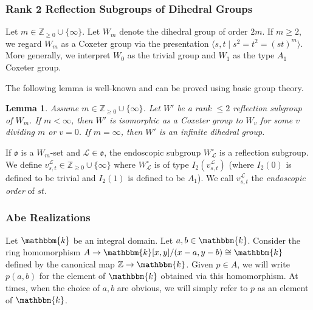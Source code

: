 \documentclass{amsart}
\newcommand{\Z}{\mathbb{Z}}
\renewcommand{\k}{\mathbbm{k}}
\newcommand{\scrL}{\mathcal{L}}
\newcommand{\fr}[1]{\mathfrak{#1}}
\newtheorem{lemma}[subsubsection]{Lemma}
\theoremstyle{definition}
\numberwithin{equation}{subsection}
\begin{document}
\subsubsection{Rank 2 Reflection Subgroups of Dihedral Groups}

Let $m \in \Z_{\geq 0} \cup \{ \infty\}$.
Let $W_m$ denote the dihedral group of order $2m$. If $m \geq 2$, we regard $W_m$ as a Coxeter group via the presentation $\langle s,t \mid s^2 = t^2 = (st)^m \rangle$.
More generally, we interpret $W_0$ as the trivial group and $W_1$ as the type $A_1$ Coxeter group. 

The following lemma is well-known and can be proved using basic group theory.

\begin{lemma}\label{lem:class_of_rk_2_subgroups_of_dihedral_groups}
    Assume $m \in \Z_{\geq 0}  \cup \{ \infty\}$.
    Let $W'$ be a rank $\leq 2$ reflection subgroup of $W_m$. If $m < \infty$, then $W'$ is isomorphic as a Coxeter group to $W_v$ for some $v$ dividing $m$ or $v = 0$.
    If $m = \infty$, then $W'$ is an infinite dihedral group.
\end{lemma}

If $\fr{o}$ is a $W_m$-set and $\scrL \in \fr{o}$, the endoscopic subgroup $W_{\scrL}^{\circ}$ is a reflection subgroup.
We define $v_{s,t}^{\scrL} \in \Z_{\geq 0} \cup \{\infty\}$ where $W_{\scrL}^{\circ}$ is of type $I_2 (v_{s,t}^{\scrL})$ (where $I_2 (0)$ is defined to be trivial and $I_2 (1)$ is defined to be $A_1$). We call $v_{s,t}^{\scrL}$ the \emph{endoscopic order} of $st$.

\subsubsection{Abe Realizations}

Let $\k$ be an integral domain. Let $a,b \in \k$. Consider the ring homomorphism $A \to \k [x,y]/(x-a, y-b) \cong \k$ defined by the canonical map $\Z \to \k$.
Given $p \in A$, we will write $p(a,b)$ for the element of $\k$ obtained via this homomorphism.
At times, when the choice of $a,b$ are obvious, we will simply refer to $p$ as an element of $\k$.
\end{document}
